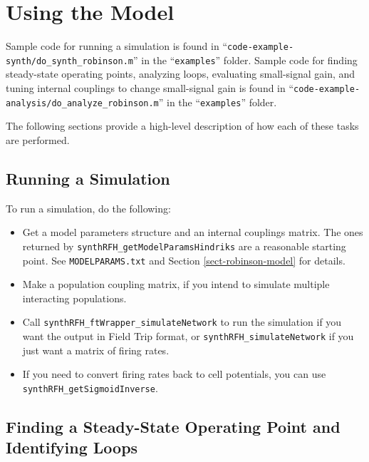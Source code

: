 
\chapter{Using the Model}
\label{sect-howto}

\begin{sloppypar}
Sample code for running a simulation is found in
``\verb|code-example-synth/do_synth_robinson.m|'' in the ``\verb|examples|''
folder. Sample code for finding steady-state operating points, analyzing
loops, evaluating small-signal gain, and tuning internal couplings to change
small-signal gain is found in
``\verb|code-example-analysis/do_analyze_robinson.m|'' in the
``\verb|examples|'' folder.
\end{sloppypar}

The following sections provide a high-level description of how each of
these tasks are performed.

%
%
\section{Running a Simulation}
\label{sect-howto-run}

To run a simulation, do the following:

\begin{sloppypar}
\begin{itemize}
%
\item Get a model parameters structure and an internal couplings matrix.
The ones returned by \verb|synthRFH_getModelParamsHindriks| are a reasonable
starting point. See \verb|MODELPARAMS.txt| and Section
\ref{sect-robinson-model} for details.
%
\item Make a population coupling matrix, if you intend to simulate multiple
interacting populations.
%
\item Call \verb|synthRFH_ftWrapper_simulateNetwork| to run the simulation
if you want the output in Field Trip format, or
\verb|synthRFH_simulateNetwork| if you just want a matrix of firing rates.
%
\item If you need to convert firing rates back to cell potentials, you can
use \verb|synthRFH_getSigmoidInverse|.
%
\end{itemize}
\end{sloppypar}

%
%
\section{Finding a Steady-State Operating Point and Identifying Loops}
\label{sect-howto-oppoint}

